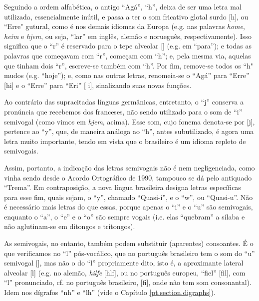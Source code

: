 \documentclass[12pt, a5paper, titlepage]{article}
\begin{document}
\begin{bilingualpages}
    Seguindo a ordem alfabética, o antigo ``Agá'', ``h'', deixa de ser uma letra
    mal utilizada, essencialmente inútil, e passa a ter o som fricativo glotal
    surdo [h], ou ``Erre" gutural, como é nos demais idiomas da Europa (e.g. nas
    palavras \textit{home}, \textit{heim} e \textit{hjem}, ou seja, ``lar'' em
    inglês, alemão e norueguês, respectivamente). Isso significa que o ``r'' é
    reservado para o tepe alveolar [\textfishhookr] (e.g. em ``para''); e todas as
    palavras que começavam com ``r'', começam com ``h''; e, pela mesma via, aquelas
    que tinham dois ``r'', escreve-se também com ``h''. Por fim, remove-se todos os
    ``h" mudos (e.g. ``hoje''); e, como nas outras letras, renomeia-se o ``Agá''
    para ``Erre'' [\textepsilon hi] e o ``Erre'' para ``Eri'' [\textepsilon
    \textfishhookr i], sinalizando suas novas funções.

    Ao contrário das supracitadas línguas germânicas, entretanto, o ``j'' conserva
    a pronúncia que recebemos dos franceses, não sendo utilizado para o som de
    ``i'' semivogal (como vimos em \textit{hjem}, acima). Esse som, cujo fonema
    denota-se por [j], pertence ao ``y'', que, de maneira análoga ao ``h'', antes
    subutilizado, é agora uma letra muito importante, tendo em vista que o
    brasileiro é um idioma repleto de semivogais.

    Assim, portanto, a indicação das letras semivogais não é nem negligenciada,
    como vinha sendo desde o Acordo Ortográfico de 1990, tampouco se dá pelo
    antiquado ``Trema''. Em contraposição, a nova língua brasileira designa letras
    específicas para esse fim, quais sejam, o ``y'', chamado ``Quasi-i'', e o
    ``w'', ou ``Quasi-u''. Não é necessário mais letras do que essas, porque apenas
    o ``i'' e o ``u'' são semivogais, enquanto o ``a'', o ``e'' e o ``o'' são
    sempre vogais (i.e. elas ``quebram'' a sílaba e não aglutinam-se em ditongos e
    tritongos).
    
    As semivogais, no entanto, também podem substituir (aparentes) consoantes. É o que verificamos no ``l'' pós-vocálico, que no português brasileiro tem o som do ``u'' semivogal [], mas não o do ``l'' propriamente dito, isto é, a aproximante lateral alveolar [l] (e.g. no alemão, \textit{hilfe} [\textprimstress h\textsci lf\textschwa], ou no português europeu, ``fiel'' [fi\textprimstress\textepsilon l], com ``l'' pronunciado, cf. no português brasileiro, [fi\textprimstress {}], onde não tem som consonantal). Idem nos dígrafos ``nh'' e ``lh'' (vide o Capítulo \ref{pt.section.digraphs}).


\end{bilingualpages}
\end{document}
